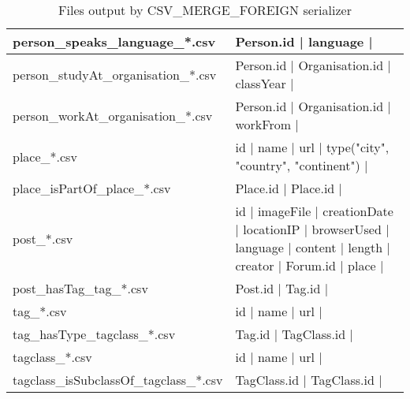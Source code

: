 \begin{landscape}
\begin{table}[t]
\begin{tabular}{|p{5cm}|p{19cm}|}
            \hline
            person\_speaks\_language\_*.csv & Person.id | language |\\
            \hline
            person\_studyAt\_organisation\_*.csv & Person.id | Organisation.id | classYear |\\  
            \hline
            person\_workAt\_organisation\_*.csv &  Person.id | Organisation.id | workFrom |\\ 
            \hline
            place\_*.csv & id | name | url | type({"city", "country", "continent"}) |\\
            \hline
            place\_isPartOf\_place\_*.csv & Place.id | Place.id |\\
            \hline
            post\_*.csv & id | imageFile | creationDate | locationIP | browserUsed | language | content | length | creator | Forum.id | place |\\
            \hline
            post\_hasTag\_tag\_*.csv & Post.id | Tag.id |\\
            \hline
            tag\_*.csv & id | name | url | \\
            \hline
            tag\_hasType\_tagclass\_*.csv & Tag.id | TagClass.id |\\
            \hline
            tagclass\_*.csv & id | name | url | \\
            \hline
            tagclass\_isSubclassOf\_tagclass\_*.csv & TagClass.id | TagClass.id |\\
            \hline
        \end{tabular}
        \caption{Files output by CSV\_MERGE\_FOREIGN serializer}
        \label{table:csv_merge_foreign}
\end{table}
\end{landscape}

